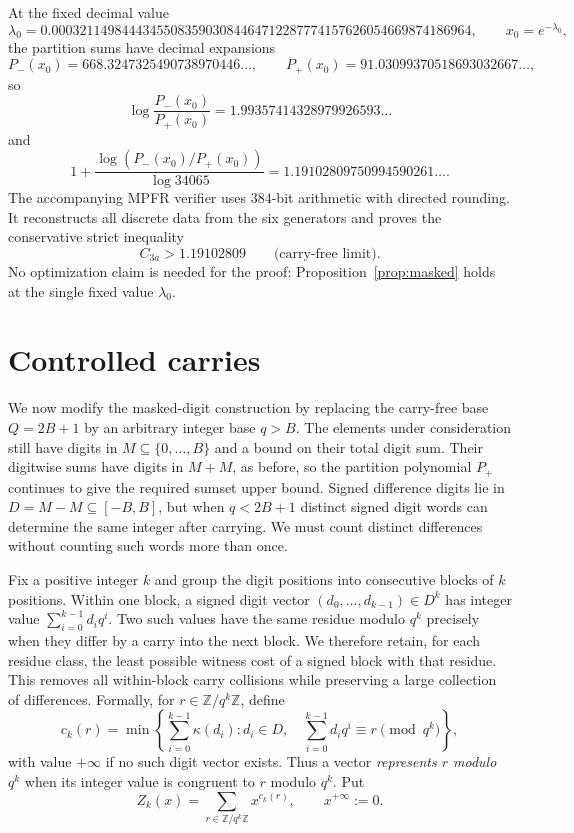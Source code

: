 \documentclass[11pt]{article}
\begin{document}
At the fixed decimal value
\[
 \lambda_0=
 0.000321149844434550835903084464712287774157626054669874186964,
 \qquad x_0=e^{-\lambda_0},
\]
the partition sums have decimal expansions
\[
 P_-(x_0)=668.3247325490738970446\ldots,
 \qquad
 P_+(x_0)=91.03099370518693032667\ldots,
\]
so
\[
 \log\frac{P_-(x_0)}{P_+(x_0)}
 =1.99357414328979926593\ldots
\]
and
\begin{equation}\label{eq:theta-numerical}
 1+\frac{\log(P_-(x_0)/P_+(x_0))}{\log 34065}
 =1.19102809750994590261\ldots.
\end{equation}
The accompanying MPFR verifier \cite{FousseEtAl2007} uses $384$-bit arithmetic with directed
rounding. It reconstructs all discrete data from the six generators and
proves the conservative strict inequality
\begin{equation}\label{eq:certified}
\boxed{C_{3a}>1.19102809}\qquad\text{(carry-free limit).}
\end{equation}
No optimization claim is needed for the proof: Proposition~\ref{prop:masked}
holds at the single fixed value $\lambda_0$.

\section{Controlled carries}
We now modify the masked-digit construction by replacing the carry-free base
$Q=2B+1$ by an arbitrary integer base $q>B$.  The elements under
consideration still have digits in $M\subseteq\{0,\ldots,B\}$ and a bound on
their total digit sum.  Their digitwise sums have digits in $M+M$, as before,
so the partition polynomial $P_+$ continues to give the required sumset
upper bound.  Signed difference digits lie in $D=M-M\subseteq[-B,B]$, but
when $q<2B+1$ distinct signed digit words can determine the same integer
after carrying.  We must count distinct differences without counting such
words more than once.

Fix a positive integer $k$ and group the digit positions into consecutive
blocks of $k$ positions.  Within one block, a signed digit vector
$(d_0,\ldots,d_{k-1})\in D^k$ has integer value
$\sum_{i=0}^{k-1}d_iq^i$.  Two such values have the same residue modulo
$q^k$ precisely when they differ by a carry into the next block.  We
therefore retain, for each residue class, the least possible witness cost of
a signed block with that residue.  This removes all within-block carry
collisions while preserving a large collection of differences.  Formally,
for $r\in\mathbb Z/q^k\mathbb Z$, define
\begin{equation}\label{eq:controlled-cost}
 c_k(r)=\min\left\{\sum_{i=0}^{k-1}\kappa(d_i):
 d_i\in D,\quad \sum_{i=0}^{k-1}d_iq^i\equiv r\pmod{q^k}\right\},
\end{equation}
with value $+\infty$ if no such digit vector exists.  Thus a vector
\emph{represents $r$ modulo $q^k$} when its integer value is congruent to
$r$ modulo $q^k$.  Put
\begin{equation}\label{eq:controlled-Z}
 Z_k(x)=\sum_{r\in\mathbb Z/q^k\mathbb Z}x^{c_k(r)},
 \qquad x^{+\infty}:=0.
\end{equation}
\end{document}
